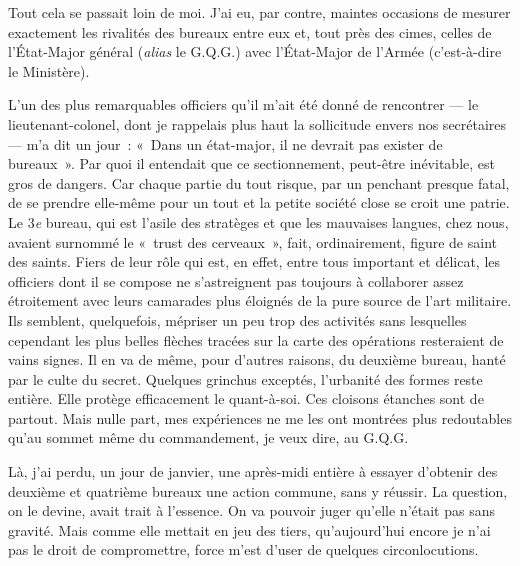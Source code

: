 \documentclass[french,twoside]{book} %
\begin{document}
Tout cela se passait loin de moi. J’ai eu, par contre, maintes occasions de mesurer exactement les rivalités des bureaux entre eux et, tout près des cimes, celles de l’État-Major général (\emph{alias} le G.Q.G.) avec l’État-Major de l’Armée (c’est-à-dire le Ministère).\par
L’un des plus remarquables officiers qu’il m’ait été   donné de rencontrer — le lieutenant-colonel, dont je rappelais plus haut la sollicitude envers nos secrétaires — m’a dit un jour : « Dans un état-major, il ne devrait pas exister de bureaux ». Par quoi il entendait que ce sectionnement, peut-être inévitable, est gros de dangers. Car chaque partie du tout risque, par un penchant presque fatal, de se prendre elle-même pour un tout et la petite société close se croit une patrie. Le 3\emph{e} bureau, qui est l’asile des stratèges et que les mauvaises langues, chez nous, avaient surnommé le « trust des cerveaux », fait, ordinairement, figure de saint des saints. Fiers de leur rôle qui est, en effet, entre tous important et délicat, les officiers dont il se compose ne s’astreignent pas toujours à collaborer assez étroitement avec leurs camarades plus éloignés de la pure source de l’art militaire. Ils semblent, quelquefois, mépriser un peu trop des activités sans lesquelles cependant les plus belles flèches tracées sur la carte des opérations resteraient de vains signes. Il en va de même, pour d’autres raisons, du deuxième bureau, hanté par le culte du secret. Quelques grinchus exceptés, l’urbanité des formes reste entière. Elle protège efficacement le quant-à-soi. Ces cloisons étanches sont de partout. Mais nulle part, mes expériences ne me les ont montrées plus redoutables qu’au sommet même du commandement, je veux dire, au G.Q.G.\par
Là, j’ai perdu, un jour de janvier, une après-midi entière à essayer d’obtenir des deuxième et quatrième bureaux une action commune, sans y réussir. La question, on le devine, avait trait à l’essence. On va pouvoir juger qu’elle n’était pas sans gravité. Mais comme elle mettait en jeu des tiers, qu’aujourd’hui encore je n’ai pas le droit de compromettre, force m’est d’user de quelques circonlocutions.\par
\end{document}
